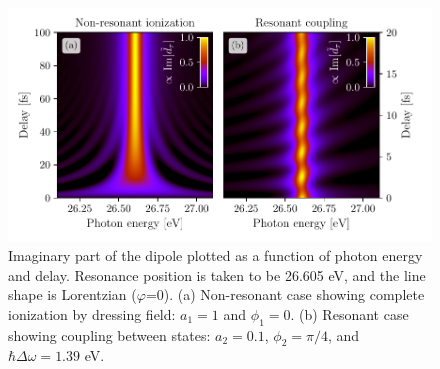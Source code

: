 \begin{figure}
	\centering
	\includegraphics[width=1.0\textwidth]{figures/ATS/resonant_vs_non_resonant.pdf}
	\caption[Imaginary part of the dipole for resonant and non-resonant effects introduced by dressing field]{Imaginary part of the dipole plotted as a function of photon energy and delay. Resonance position is taken to be 26.605 eV, and the line shape is Lorentzian ($\varphi$=0).  (a) Non-resonant case showing complete ionization by dressing field: $a_1=1$ and $\phi_{1}=0$.  (b) Resonant case showing coupling between states: $a_2=0.1$, $\phi_{2}=\pi/4$, and  $\hbar\Delta\omega=1.39$ eV.}
	\label{fig:res_vs_non_res}
\end{figure}


